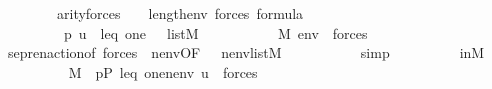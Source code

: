 \begin{isabellebody}
\ \ \ \ \ \ \ \ {\isacartoucheopen}arity{\isacharparenleft}{\kern0pt}forces{\isacharparenleft}{\kern0pt}{\isacharquery}{\kern0pt}{\isasymchi}{\isacharparenright}{\kern0pt}{\isacharparenright}{\kern0pt}\ {\isasymle}\ {}\ {\isacharhash}{\kern0pt}{\isacharplus}{\kern0pt}\ length{\isacharparenleft}{\kern0pt}env{\isacharparenright}{\kern0pt}{\isacartoucheclose}\ {\isacartoucheopen}forces{\isacharparenleft}{\kern0pt}{\isacharquery}{\kern0pt}{\isasymchi}{\isacharparenright}{\kern0pt}{\isasymin}\ formula{\isacartoucheclose}\isanewline
\ \ \ \ \ \ \ \ {\isacartoucheopen}{\isacharbrackleft}{\kern0pt}{\isasymtheta}{\isacharcomma}{\kern0pt}\ p{\isacharcomma}{\kern0pt}\ u{\isacharcomma}{\kern0pt}\ {\isasympi}{\isacharcomma}{\kern0pt}\ leq{\isacharcomma}{\kern0pt}\ one{\isacharcomma}{\kern0pt}\ {\isasympi}{\isacharbrackright}{\kern0pt}\ {\isasymin}\ list{\isacharparenleft}{\kern0pt}M{\isacharparenright}{\kern0pt}{\isacartoucheclose}\ \isanewline
\ \ \ \ \ \ \isamarkupfalse%
\ {\isachardoublequoteopen}{\isachardot}{\kern0pt}{\isachardot}{\kern0pt}{\isachardot}{\kern0pt}\ {\isasymlongleftrightarrow}\ M{\isacharcomma}{\kern0pt}\ {\isacharquery}{\kern0pt}env\ {\isasymTurnstile}\ forces{\isacharparenleft}{\kern0pt}{\isacharquery}{\kern0pt}{\isasymchi}{\isacharparenright}{\kern0pt}{\isachardoublequoteclose}\isanewline
\ \ \ \ \ \ \ \ \isamarkupfalse%
\ sepren{\isacharunderscore}{\kern0pt}action{\isacharbrackleft}{\kern0pt}of\ {\isachardoublequoteopen}forces{\isacharparenleft}{\kern0pt}{\isacharquery}{\kern0pt}{\isasymchi}{\isacharparenright}{\kern0pt}{\isachardoublequoteclose}\ \ {\isachardoublequoteopen}nenv{\isachardoublequoteclose}{\isacharcomma}{\kern0pt}OF\ {\isacharunderscore}{\kern0pt}\ {\isacharunderscore}{\kern0pt}\ {\isacartoucheopen}nenv{\isasymin}list{\isacharparenleft}{\kern0pt}M{\isacharparenright}{\kern0pt}{\isacartoucheclose}{\isacharbrackright}{\kern0pt}\ \isanewline
\ \ \ \ \ \ \ \ \isamarkupfalse%
\ simp\isanewline
\ \ \ \ \ \ \isamarkupfalse%
\ \isamarkupfalse%
\ in{\isacharunderscore}{\kern0pt}M{\isacharprime}{\kern0pt}\isanewline
\ \ \ \ \ \ \isamarkupfalse%
\ {\isachardoublequoteopen}{\isachardot}{\kern0pt}{\isachardot}{\kern0pt}{\isachardot}{\kern0pt}\ {\isasymlongleftrightarrow}\ M{\isacharcomma}{\kern0pt}\ \ {\isacharparenleft}{\kern0pt}{\isacharbrackleft}{\kern0pt}p{\isacharcomma}{\kern0pt}P{\isacharcomma}{\kern0pt}\ leq{\isacharcomma}{\kern0pt}\ one{\isacharcomma}{\kern0pt}{\isasymtheta}{\isacharbrackright}{\kern0pt}{\isacharat}{\kern0pt}nenv{\isacharat}{\kern0pt}\ {\isacharbrackleft}{\kern0pt}{\isasympi}{\isacharbrackright}{\kern0pt}{\isacharparenright}{\kern0pt}{\isacharat}{\kern0pt}{\isacharbrackleft}{\kern0pt}u{\isacharbrackright}{\kern0pt}\ {\isasymTurnstile}\ forces{\isacharparenleft}{\kern0pt}{\isacharquery}{\kern0pt}{\isasymchi}{\isacharparenright}{\kern0pt}{\isachardoublequoteclose}\ \isanewline

\end{isabellebody}
